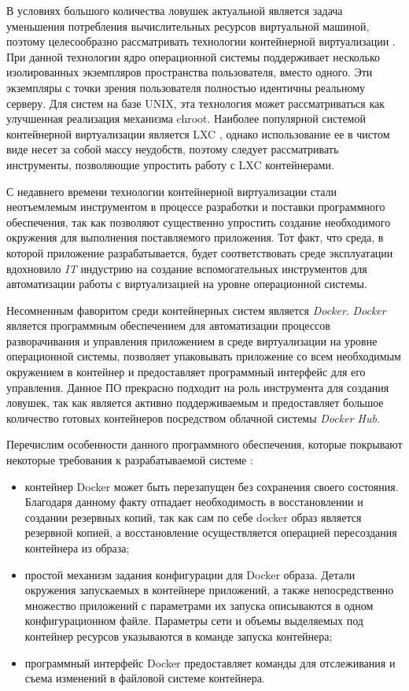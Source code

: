В условиях большого количества ловушек актуальной является задача уменьшения потребления вычислительных ресурсов виртуальной машиной, поэтому целесообразно рассматривать технологии контейнерной виртуализации \citep{Joy2015}. При данной технологии ядро операционной системы поддерживает несколько изолированных экземпляров пространства пользователя, вместо одного. Эти экземпляры с точки зрения пользователя полностью идентичны реальному серверу. Для систем на базе UNIX, эта технология может рассматриваться как улучшенная реализация механизма chroot. Наиболее популярной системой контейнерной виртуализации является LXC \citep{lxc_doc}, однако использование ее в чистом виде несет за собой массу неудобств, поэтому следует рассматривать инструменты, позволяющие упростить работу с LXC контейнерами.

С недавнего времени технологии контейнерной виртуализации стали неотъемлемым инструментом в процессе разработки и поставки программного обеспечения, так как позволяют существенно упростить создание необходимого окружения для выполнения поставляемого приложения. Тот факт, что среда, в которой приложение разрабатывается, будет соответствовать среде эксплуатации вдохновило \textit{IT} индустрию на создание вспомогательных инструментов для автоматизации работы с виртуализацией на уровне операционной системы.

Несомненным фаворитом среди контейнерных систем является \textit{Docker}.
\textit{Docker} является программным обеспечением для автоматизации процессов разворачивания и управления приложением в среде виртуализации на уровне операционной системы, позволяет упаковывать приложение со всем необходимым окружением в контейнер и предоставляет программный интерфейс для его управления. Данное ПО прекрасно подходит на роль инструмента для создания ловушек, так как является активно поддерживаемым и предоставляет большое количество готовых контейнеров посредством облачной системы \textit{Docker Hub}.

Перечислим особенности данного программного обеспечения, которые покрывают некоторые требования к разрабатываемой системе \citep{Boettiger2015}:

\begin{itemize}
\item  контейнер Docker может быть перезапущен без сохранения своего состояния. Благодаря данному факту отпадает необходимость в восстановлении и создании резервных копий, так как сам по себе docker образ является резервной копией, а восстановление осуществляется  операцией пересоздания контейнера из образа;
\item  простой механизм задания конфигурации для Docker образа. Детали окружения запускаемых в контейнере приложений, а также непосредственно множество приложений с параметрами их запуска описываются в одном конфигурационном файле. Параметры сети и объемы выделяемых под контейнер ресурсов указываются в команде запуска контейнера;
\item  программный интерфейс Docker предоставляет команды для отслеживания и съема изменений в файловой системе контейнера.
\end{itemize}

